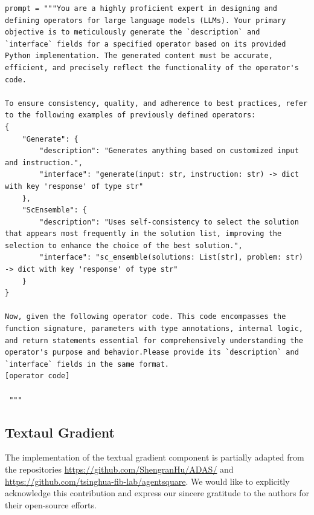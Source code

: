 \documentclass{article}
\theoremstyle{plain}
\theoremstyle{definition}
\theoremstyle{remark}
\begin{document}
\begin{tcolorbox}[notitle, sharp corners, breakable, colframe=Periwinkle, colback=white, 
       boxrule=3pt, boxsep=0.5pt, enhanced, 
       shadow={3pt}{-3pt}{0pt}{opacity=1,mygrey},
       title={Embedding Prompt},]\label{box:operator-profile}
       \footnotesize
       {\selectfont
\begin{lstlisting}
prompt = """You are a highly proficient expert in designing and defining operators for large language models (LLMs). Your primary objective is to meticulously generate the `description` and `interface` fields for a specified operator based on its provided Python implementation. The generated content must be accurate, efficient, and precisely reflect the functionality of the operator's code.

To ensure consistency, quality, and adherence to best practices, refer to the following examples of previously defined operators:
{
    "Generate": {
        "description": "Generates anything based on customized input and instruction.",
        "interface": "generate(input: str, instruction: str) -> dict with key 'response' of type str" 
    },
    "ScEnsemble": {
        "description": "Uses self-consistency to select the solution that appears most frequently in the solution list, improving the selection to enhance the choice of the best solution.",
        "interface": "sc_ensemble(solutions: List[str], problem: str) -> dict with key 'response' of type str"
    }
}

Now, given the following operator code. This code encompasses the function signature, parameters with type annotations, internal logic, and return statements essential for comprehensively understanding the operator's purpose and behavior.Please provide its `description` and `interface` fields in the same format.
[operator code]

 """
\end{lstlisting}
}
\end{tcolorbox}


\subsection{Textaul Gradient}\label{app:text-gradient}

The implementation of the textual gradient component is partially adapted from the repositories \url{https://github.com/ShengranHu/ADAS/} and \url{https://github.com/tsinghua-fib-lab/agentsquare}. We would like to explicitly acknowledge this contribution and express our sincere gratitude to the authors for their open-source efforts.
\end{document}
